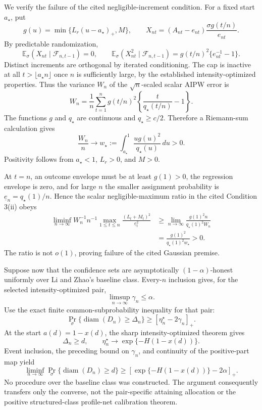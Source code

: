 We verify the failure of the cited negligible-increment condition.  For a fixed start \(a_\star\), put
\[
 g(u)=\min\{L_r(u-a_\star)_+,M\},
 \qquad
 X_{nt}=(A_{nt}-e_{nt})\frac{\sigma g(t/n)}{e_{nt}}.
\]
By predictable randomization,
\[
 \mathbb E_\sigma(X_{nt}\mid\mathcal F_{n,t-1})=0,
 \qquad
 \mathbb E_\sigma(X_{nt}^2\mid\mathcal F_{n,t-1})
 =g(t/n)^2\{e_{nt}^{-1}-1\}.
\]
Distinct increments are orthogonal by iterated conditioning.  The cap is inactive at all \(t>\lfloor a_\star n\rfloor\) once \(n\) is sufficiently large, by the established intensity-optimized properties.  Thus the variance \(W_n\) of the \(\sqrt n\)-scaled scalar AIPW error is
\[
 W_n=\frac1n\sum_{t=1}^n
 g(t/n)^2\left\{\frac{t}{q_\star(t/n)}-1\right\}.
\]
The functions \(g\) and \(q_\star\) are continuous and \(q_\star\ge c/2\).  Therefore a Riemann-sum calculation gives
\[
 \frac{W_n}{n}\longrightarrow
 w_\star:=\int_{a_\star}^1
 \frac{u g(u)^2}{q_\star(u)}\,du>0.
\]
Positivity follows from \(a_\star<1\), \(L_r>0\), and \(M>0\).

At \(t=n\), an outcome envelope must be at least \(g(1)>0\), the regression envelope is zero, and for large \(n\) the smaller assignment probability is \(\underline e_n=q_\star(1)/n\).  Hence the scalar negligible-maximum ratio in the cited Condition 3(ii) obeys
\[
\begin{aligned}
 \liminf_{n\to\infty}
 W_n^{-1}n^{-1}
 \max_{1\le t\le n}\frac{(L_t+M_t)^2}{\underline e_t^2}
 &\ge
 \lim_{n\to\infty}
 \frac{g(1)^2n}{q_\star(1)^2W_n}\\
 &=\frac{g(1)^2}{q_\star(1)^2w_\star}>0.
\end{aligned}
\]
The ratio is not \(o(1)\), proving failure of the cited Gaussian premise.

Suppose now that the confidence sets are asymptotically \((1-\alpha)\)-honest uniformly over Li and Zhao's baseline class.  Every-\(n\) inclusion gives, for the selected intensity-optimized pair,
\[
 \limsup_{n\to\infty}\gamma_n\le\alpha.
\]
Use the exact finite common-subprobability inequality for that pair:
\[
 \Pr_\sigma\{\operatorname{diam}(D_n)\ge\Delta_n\}
 \ge[\eta_n^\star-2\gamma_n]_+.
\]
At the start \(a(d)=1-x(d)\), the sharp intensity-optimized theorem gives
\[
 \Delta_n\ge d,
 \qquad
 \eta_n^\star\longrightarrow\exp\{-H(1-x(d))\}.
\]
Event inclusion, the preceding bound on \(\gamma_n\), and continuity of the positive-part map yield
\[
 \liminf_{n\to\infty}
 \Pr_\sigma\{\operatorname{diam}(D_n)\ge d\}
 \ge
 \left[\exp\{-H(1-x(d))\}-2\alpha\right]_+.
\]
No procedure over the baseline class was constructed.  The argument consequently transfers only the converse, not the pair-specific attaining allocation or the positive structured-class profile-net calibration theorem.
